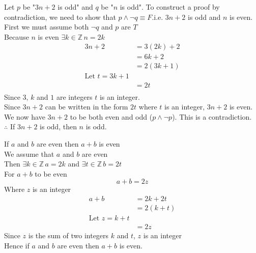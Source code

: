 \documentclass[12pt letter]{report}
\begin{document}

\begin{myproof}
	Let $p$ be "$3n + 2$ is odd" and $q$ be "$n$ is odd". To construct a proof by contradiction, we need to show that
	$p \wedge \neg q \equiv F$.i.e. $3n + 2$ is odd and $n$ is even.\\
	First we must assume both $\neg  q$ and $ p$ are $T$\\
	Because $n$ is even $\exists k \in \mathbb{Z} \, n = 2k$
	\begin{align*}
		3n + 2 & = 3 \left( 2k \right)  + 2 \\
		       & = 6k + 2                   \\
		       & = 2 \left( 3k + 1 \right)  \\
		\text{Let $t = 3k + 1$}             \\
		       & = 2t                       \\
	\end{align*}
	Since $3$, $k$ and $1$ are integers $t$ is an integer.\\
	Since $3n + 2$ can be written in the form $2t$ where $t$ is an integer, $3n + 2$ is even.\\
	We now have $3n + 2$ to be both even and odd ($p \wedge \neg p$). This is a contradiction.\\
	$\therefore$ If $3n + 2$ is odd, then $n$ is odd.
\end{myproof}


\begin{myproof}
	If $a$ and $b$ are even then $a + b$ is even\\
	We assume that $a$ and $b$ are even\\
	Then $\exists k \in \mathbb{Z} \, a = 2k$ and $\exists t \in \mathbb{Z} \, b = 2t$\\

	\noindent For $a + b$ to be even\\
	\[
		a + b = 2z
	\]
	Where $z$ is an integer
	\begin{align*}
		a + b & = 2k + 2t                \\
		      & = 2 \left( k + t \right) \\
		\text{Let } z =  k + t           \\
		      & = 2z
	\end{align*}
	Since $z$ is the sum of two integers $k$ and $t$, $z$ is an integer\\
	Hence if $a$ and $b$ are even then $a + b$ is even.
\end{myproof}
\end{document}
